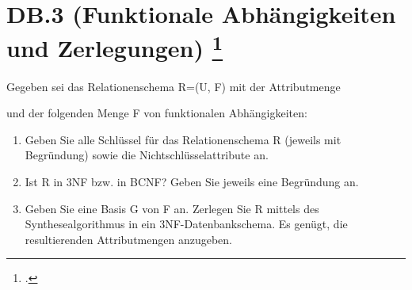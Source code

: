 \documentclass{lehramt-informatik-aufgabe}
\begin{document}
\section{DB.3 (Funktionale Abhängigkeiten und Zerlegungen)
\footcite{66116:2015:03}}

Gegeben sei das Relationenschema R=(U, F) mit der Attributmenge

\begin{center}
\end{center}

und der folgenden Menge F von funktionalen Abhängigkeiten:

\begin{center}
\end{center}

\begin{enumerate}


\item Geben Sie alle Schlüssel für das Relationenschema R (jeweils mit
Begründung) sowie die Nichtschlüsselattribute an.


\item Ist R in 3NF bzw. in BCNF? Geben Sie jeweils eine Begründung an.


\item Geben Sie eine Basis G von F an. Zerlegen Sie R mittels des
Synthesealgorithmus in ein 3NF-Datenbankschema. Es genügt, die
resultierenden Attributmengen anzugeben.
\end{enumerate}
\end{document}
